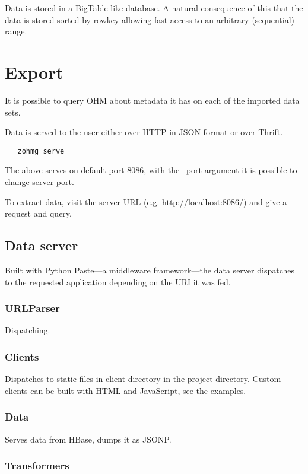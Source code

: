 \documentclass[a4paper,10pt]{book}
\begin{document}
Data is stored in a BigTable like database. A natural consequence of this
that the data is stored sorted by rowkey allowing fast access to an
arbitrary (sequential) range.



\section{Export}

It is possible to query OHM about metadata it has on each of the imported
data sets.

Data is served to the user either over HTTP in JSON format or over Thrift.
\cite{thrift}

\begin{verbatim}
   zohmg serve
\end{verbatim}

\noindent The above serves on default port 8086, with the --port argument
it is possible to change server port.

To extract data, visit the server URL (e.g. http://localhost:8086/) and
give a request and query.


\subsection{Data server}

Built with Python Paste---a middleware framework---the data server dispatches
to the requested application depending on the URI it was fed.


\subsubsection{URLParser}

Dispatching.


\subsubsection{Clients}

Dispatches to static files in client directory in the project directory.
Custom clients can be built with HTML and JavaScript, see the examples.


\subsubsection{Data}

Serves data from HBase, dumps it as JSONP.


\subsubsection{Transformers}
\end{document}
